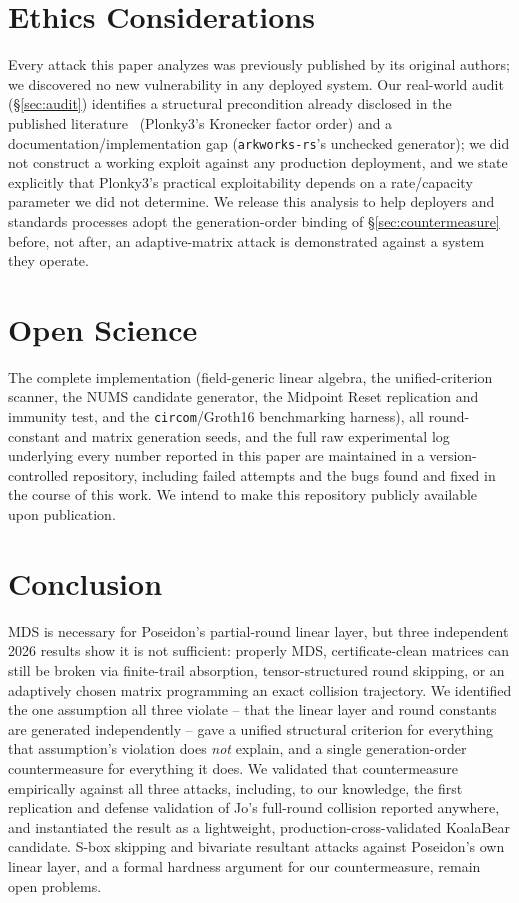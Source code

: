 \documentclass[conference]{IEEEtran}
\theoremstyle{definition}
\theoremstyle{plain}
\begin{document}
\section{Ethics Considerations}
Every attack this paper analyzes was previously published by its
original authors; we discovered no new vulnerability in any deployed
system. Our real-world audit (\S\ref{sec:audit}) identifies a
structural precondition already disclosed in the published
literature~\cite{cryptoeprint:2026/306} (Plonky3's Kronecker factor
order) and a documentation/implementation gap
(\texttt{arkworks-rs}'s unchecked generator); we did not construct a
working exploit against any production deployment, and we state
explicitly that Plonky3's practical exploitability depends on a
rate/capacity parameter we did not determine. We release this analysis
to help deployers and standards processes adopt the generation-order
binding of \S\ref{sec:countermeasure} before, not after, an adaptive-matrix
attack is demonstrated against a system they operate.

\section{Open Science}
The complete implementation (field-generic linear algebra, the
unified-criterion scanner, the NUMS candidate generator, the Midpoint
Reset replication and immunity test, and the \texttt{circom}/Groth16
benchmarking harness), all round-constant and matrix generation seeds,
and the full raw experimental log underlying every number reported in
this paper are maintained in a version-controlled repository, including
failed attempts and the bugs found and fixed in the course of this work.
We intend to make this repository publicly available upon publication.

\section{Conclusion}
MDS is necessary for Poseidon's partial-round linear layer, but three
independent 2026 results show it is not sufficient: properly MDS,
certificate-clean matrices can still be broken via finite-trail
absorption, tensor-structured round skipping, or an adaptively chosen
matrix programming an exact collision trajectory. We identified the one
assumption all three violate -- that the linear layer and round
constants are generated independently -- gave a unified structural
criterion for everything that assumption's violation does \emph{not}
explain, and a single generation-order countermeasure for everything it
does. We validated that countermeasure empirically against all three
attacks, including, to our knowledge, the first replication and defense
validation of Jo's full-round collision reported anywhere, and
instantiated the result as a lightweight, production-cross-validated
KoalaBear candidate. S-box skipping and bivariate resultant attacks
against Poseidon's own linear layer, and a formal hardness argument for
our countermeasure, remain open problems.

\printbibliography
\end{document}
